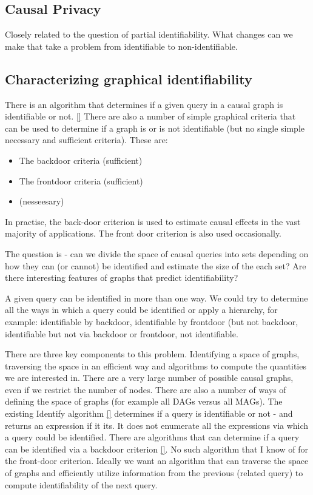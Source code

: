 \documentclass{article}
\theoremstyle{plain}
\theoremstyle{definition}
\begin{document}
\subsection*{Causal Privacy}

Closely related to the question of partial identifiability. What changes can we make that take a problem from identifiable to non-identifiable. 

\subsection*{Characterizing graphical identifiability}

There is an algorithm that determines if a given query in a causal graph is identifiable or not. \ref{} There are also a number of simple graphical criteria that can be used to determine if a graph is or is not identifiable (but no single simple necessary and sufficient criteria). These are:

\begin{itemize}
\item The backdoor criteria (sufficient)
\item The frontdoor criteria (sufficient)
\item (nesseesary)
\end{itemize}

In practise, the back-door criterion is used to estimate causal effects in the vast majority of applications. The front door criterion is also used occasionally. 

The question is - can we divide the space of causal queries into sets depending on how they can (or cannot) be identified and estimate the size of the each set? Are there interesting features of graphs that predict identifiability?

A given query can be identified in more than one way. We could try to determine all the ways in which a query could be identified or apply a hierarchy, for example: identifiable by backdoor, identifiable by frontdoor (but not backdoor, identifiable but not via backdoor or frontdoor, not identifiable. 

There are three key components to this problem. Identifying a space of graphs, traversing the space in an efficient way and algorithms to compute the quantities we are interested in. There are a very large number of possible causal graphs, even  if we restrict the number of nodes. There are also a number of ways of defining the space of graphs (for example all DAGs versus all MAGs). The existing Identify algorithm \ref{} determines if a query is identifiable or not - and returns an expression if it its. It does not enumerate all the expressions via which a query could be identified. There are algorithms that can determine if a query can be identified via a backdoor criterion \ref{}. No such algorithm that I know of for the front-door criterion. Ideally we want an algorithm that can traverse the space of graphs and efficiently utilize information from the previous (related query) to compute identifiability of the next query. 
\end{document}
